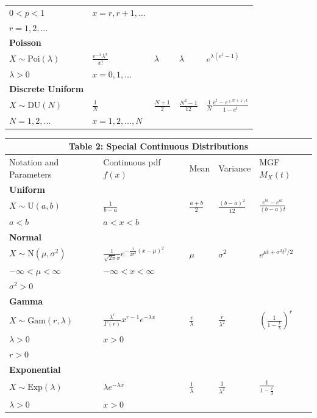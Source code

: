 \documentclass{article}
\begin{document}
\begin{center}
\begin{tabular}{lllll}
\quad $0 < p < 1$ & $x = r, r+1, \dots$ & & & \\
\quad $r = 1, 2, \dots$ & & & & \\
\midrule
\textbf{Poisson} & & & & \\
\quad $X \sim \text{Poi}(\lambda)$ & $\frac{e^{-\lambda}\lambda^x}{x!}$ & $\lambda$ & $\lambda$ & $e^{\lambda(e^t - 1)}$ \\
\quad $\lambda > 0$ & $x = 0, 1, \dots$ & & & \\
\midrule
\textbf{Discrete Uniform} & & & & \\
\quad $X \sim \text{DU}(N)$ & $\frac{1}{N}$ & $\frac{N+1}{2}$ & $\frac{N^2 - 1}{12}$ & $\frac{1}{N}\frac{e^t - e^{(N+1)t}}{1 - e^t}$ \\
\quad $N = 1, 2, \dots$ & $x = 1, 2, \dots, N$ & & & \\
\bottomrule
\end{tabular}
\end{center}

\begin{center}
\renewcommand{\arraystretch}{1.15}
\small
\begin{tabular}{lllll}
\multicolumn{5}{c}{\textbf{Table 2: Special Continuous Distributions}} \\[0.5em]
\toprule
Notation and Parameters & Continuous pdf $f(x)$ & Mean & Variance & MGF $M_X(t)$ \\
\midrule
\textbf{Uniform} & & & & \\
\quad $X \sim \text{U}(a, b)$ & $\frac{1}{b-a}$ & $\frac{a+b}{2}$ & $\frac{(b-a)^2}{12}$ & $\frac{e^{bt} - e^{at}}{(b-a)t}$ \\
\quad $a < b$ & $a < x < b$ & & & \\
\midrule
\textbf{Normal} & & & & \\
\quad $X \sim \text{N}(\mu, \sigma^2)$ & $\frac{1}{\sqrt{2\pi}\sigma} e^{-\frac{1}{2\sigma^2}(x-\mu)^2}$ & $\mu$ & $\sigma^2$ & $e^{\mu t + \sigma^2 t^2/2}$ \\
\quad $-\infty < \mu < \infty$ & $-\infty < x < \infty$ & & & \\
\quad $\sigma^2 > 0$ & & & & \\
\midrule
\textbf{Gamma} & & & & \\
\quad $X \sim \text{Gam}(r, \lambda)$ & $\frac{\lambda^r}{\Gamma(r)} x^{r-1} e^{-\lambda x}$ & $\frac{r}{\lambda}$ & $\frac{r}{\lambda^2}$ & $\left(\frac{1}{1 - \frac{t}{\lambda}}\right)^r$ \\
\quad $\lambda > 0$ & $x > 0$ & & & \\
\quad $r > 0$ & & & & \\
\midrule
\textbf{Exponential} & & & & \\
\quad $X \sim \text{Exp}(\lambda)$ & $\lambda e^{-\lambda x}$ & $\frac{1}{\lambda}$ & $\frac{1}{\lambda^2}$ & $\frac{1}{1 - \frac{t}{\lambda}}$ \\
\quad $\lambda > 0$ & $x > 0$ & & & \\
\bottomrule
\end{tabular}
\end{center}
\end{document}
